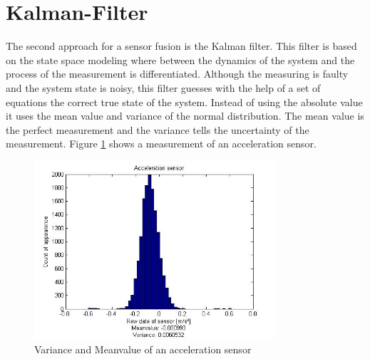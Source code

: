 \newpage
\section{Kalman-Filter}
\label{sec:KalmanFilter}

The second approach for a sensor fusion is the Kalman filter. This filter is based on the state space modeling where between the dynamics of the system and the process of the measurement is differentiated. Although the measuring is faulty and the system state is noisy, this filter guesses with the help of a set of equations the correct true state of the system. Instead of using the absolute value it uses the mean value and variance of the normal distribution. The mean value is the perfect measurement and the variance tells the uncertainty of the measurement. Figure \ref{fig:measurement} shows a measurement of an acceleration sensor.
\begin{figure}[H]
	\centering\includegraphics[width=0.8\textwidth]{fig/Kal_Comp/AccX.jpg}
	\caption{Variance and Meanvalue of an acceleration sensor}
	\label{fig:measurement}
\end{figure}

